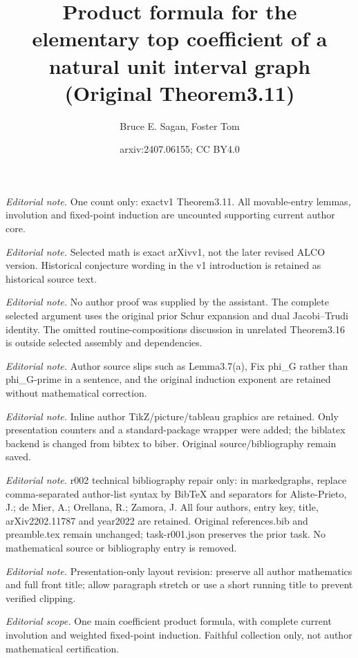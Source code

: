 \documentclass[10pt,a4paper]{amsart}
\title{Product formula for the elementary top coefficient of a natural unit interval graph (Original Theorem3.11)}
\author{Bruce E. Sagan, Foster Tom}
\date{arxiv:2407.06155; CC BY4.0}
\theoremstyle{definition}
\theoremstyle{remark}
\numberwithin{equation}{section}
\begin{document}
\maketitle
\noindent\textit{Editorial note.} One count only: exactv1 Theorem3.11. All movable-entry lemmas, involution and fixed-point induction are uncounted supporting current author core.\par\medskip
\noindent\textit{Editorial note.} Selected math is exact arXivv1, not the later revised ALCO version. Historical conjecture wording in the v1 introduction is retained as historical source text.\par\medskip
\noindent\textit{Editorial note.} No author proof was supplied by the assistant. The complete selected argument uses the original prior Schur expansion and dual Jacobi–Trudi identity. The omitted routine-compositions discussion in unrelated Theorem3.16 is outside selected assembly and dependencies.\par\medskip
\noindent\textit{Editorial note.} Author source slips such as Lemma3.7(a), Fix phi\_G rather than phi\_G-prime in a sentence, and the original induction exponent are retained without mathematical correction.\par\medskip
\noindent\textit{Editorial note.} Inline author TikZ/picture/tableau graphics are retained. Only presentation counters and a standard-package wrapper were added; the biblatex backend is changed from bibtex to biber. Original source/bibliography remain saved.\par\medskip
\noindent\textit{Editorial note.} r002 technical bibliography repair only: in markedgraphs, replace comma-separated author-list syntax by BibTeX and separators for Aliste-Prieto, J.; de Mier, A.; Orellana, R.; Zamora, J. All four authors, entry key, title, arXiv2202.11787 and year2022 are retained. Original references.bib and preamble.tex remain unchanged; task-r001.json preserves the prior task. No mathematical source or bibliography entry is removed.\par\medskip
\noindent\textit{Editorial note.} Presentation-only layout revision: preserve all author mathematics and full front title; allow paragraph stretch or use a short running title to prevent verified clipping.\par\medskip
\noindent\textit{Editorial scope.} One main coefficient product formula, with complete current involution and weighted fixed-point induction. Faithful collection only, not author mathematical certification.\par\medskip
\end{document}
